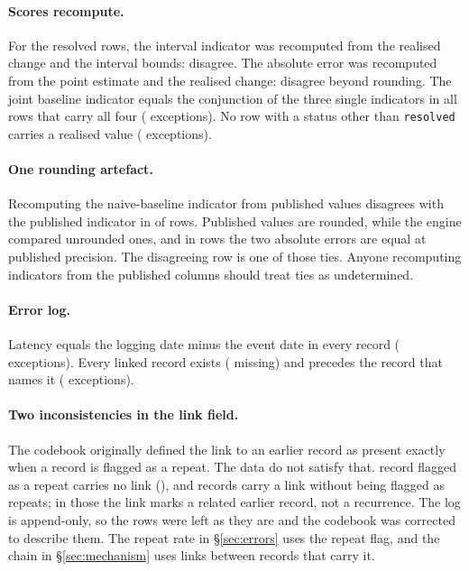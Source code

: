 \documentclass[11pt,a4paper]{article}
\begin{document}
\paragraph{Scores recompute.} For the \VBandChecked{} resolved rows, the
interval indicator was recomputed from the realised change and the interval
bounds: \VBandMismatch{} disagree. The absolute error was recomputed from the
point estimate and the realised change: \VErrMismatch{} disagree beyond
rounding. The joint baseline indicator equals the conjunction of the three
single indicators in all \VBeatChecked{} rows that carry all four
(\VBeatMismatch{} exceptions). No row with a status other than
\texttt{resolved} carries a realised value (\VUnflaggedNonResolved{}
exceptions).

\paragraph{One rounding artefact.} Recomputing the naive-baseline indicator
from published values disagrees with the published indicator in
\VNaiveMismatch{} of \VNaiveChecked{} rows. Published values are rounded,
while the engine compared unrounded ones, and in \VNaiveTies{} rows the two
absolute errors are equal at published precision. The disagreeing row is one
of those ties. Anyone recomputing indicators from the published columns
should treat ties as undetermined.

\paragraph{Error log.} Latency equals the logging date minus the event date in
every record (\VLatencyMismatch{} exceptions). Every linked record exists
(\VPriorMissing{} missing) and precedes the record that names it
(\VPriorNotEarlier{} exceptions).

\paragraph{Two inconsistencies in the link field.} The codebook originally
defined the link to an earlier record as present exactly when a record is
flagged as a repeat. The data do not satisfy that. \VRepeatWithoutLink{}
record flagged as a repeat carries no link (\VRepeatWithoutLinkId), and
\VLinkWithoutRepeat{} records carry a link without being flagged as repeats;
in those the link marks a related earlier record, not a recurrence. The log
is append-only, so the rows were left as they are and the codebook was
corrected to describe them. The repeat rate in \S\ref{sec:errors} uses the
repeat flag, and the chain in \S\ref{sec:mechanism} uses links between records
that carry it.
\end{document}
